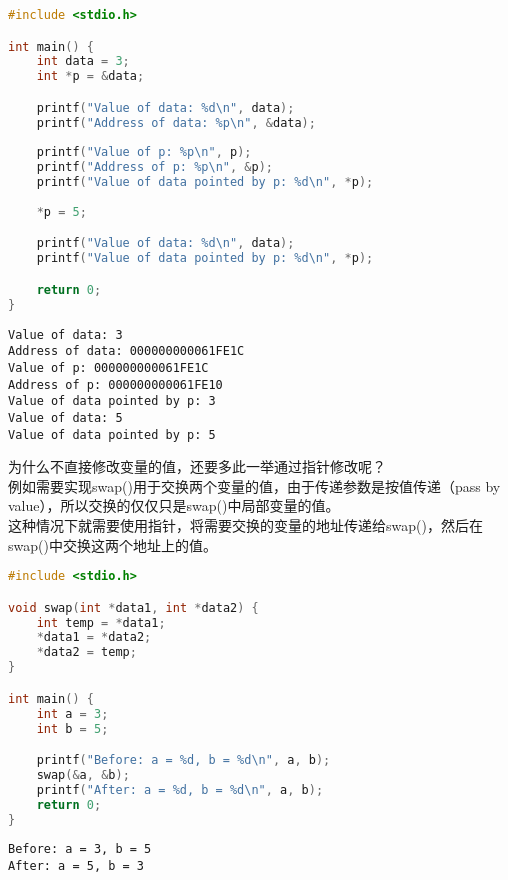 
\begin{lstlisting}[language=C]
#include <stdio.h>

int main() {
    int data = 3;
    int *p = &data;

    printf("Value of data: %d\n", data);
    printf("Address of data: %p\n", &data);
    
    printf("Value of p: %p\n", p);
    printf("Address of p: %p\n", &p);
    printf("Value of data pointed by p: %d\n", *p);
    
    *p = 5;

    printf("Value of data: %d\n", data);
    printf("Value of data pointed by p: %d\n", *p);

    return 0;
}
\end{lstlisting}

\begin{tcolorbox}
    \begin{verbatim}
Value of data: 3
Address of data: 000000000061FE1C
Value of p: 000000000061FE1C     
Address of p: 000000000061FE10   
Value of data pointed by p: 3
Value of data: 5
Value of data pointed by p: 5
	\end{verbatim}
\end{tcolorbox}

为什么不直接修改变量的值，还要多此一举通过指针修改呢？\\

例如需要实现swap()用于交换两个变量的值，由于传递参数是按值传递（pass by value），所以交换的仅仅只是swap()中局部变量的值。\\

这种情况下就需要使用指针，将需要交换的变量的地址传递给swap()，然后在swap()中交换这两个地址上的值。\\


\begin{lstlisting}[language=C]
#include <stdio.h>

void swap(int *data1, int *data2) {
    int temp = *data1;
    *data1 = *data2;
    *data2 = temp;
}

int main() {
    int a = 3;
    int b = 5;

    printf("Before: a = %d, b = %d\n", a, b);
    swap(&a, &b);
    printf("After: a = %d, b = %d\n", a, b);
    return 0;
}
\end{lstlisting}

\begin{tcolorbox}
    \begin{verbatim}
Before: a = 3, b = 5
After: a = 5, b = 3
	\end{verbatim}
\end{tcolorbox}

